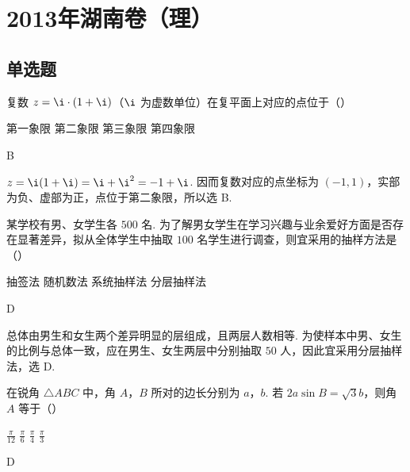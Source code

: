 \chapter{2013年湖南卷（理）}

\section{单选题}

\begin{problem}
复数 \(z = \i \cdot (1 + \i)\)（\(\i\) 为虚数单位）在复平面上对应的点位于（\quad）

\choices
    {第一象限}
    {第二象限}
    {第三象限}
    {第四象限}
\end{problem}

\begin{answer}
B
\end{answer}

\begin{solution}
\(z=\i(1+\i)=\i+\i^{2}=-1+\i\). 因而复数对应的点坐标为 \((-1,1)\)，实部为负、虚部为正，点位于第二象限，所以选 B.
\end{solution}

\begin{problem}
某学校有男、女学生各 \(500\text{ 名}\). 为了解男女学生在学习兴趣与业余爱好方面是否存在显著差异，拟从全体学生中抽取 \(100\text{ 名}\)学生进行调查，则宜采用的抽样方法是（\quad）

\choices
    {抽签法}
    {随机数法}
    {系统抽样法}
    {分层抽样法}
\end{problem}

\begin{answer}
D
\end{answer}

\begin{solution}
总体由男生和女生两个差异明显的层组成，且两层人数相等. 为使样本中男、女生的比例与总体一致，应在男生、女生两层中分别抽取 \(50\) 人，因此宜采用分层抽样法，选 D.
\end{solution}

\begin{problem}
在锐角 \(\triangle ABC\) 中，角 \(A\)，\(B\) 所对的边长分别为 \(a\)，\(b\). 若 \(2a \sin B = \sqrt{3} b\)，则角 \(A\) 等于（\quad）

\choices
    {\( \frac{\pi}{12} \)}
    {\( \frac{\pi}{6} \)}
    {\( \frac{\pi}{4} \)}
    {\(\frac{\pi}{3}\)}
\end{problem}

\begin{answer}
D
\end{answer}

